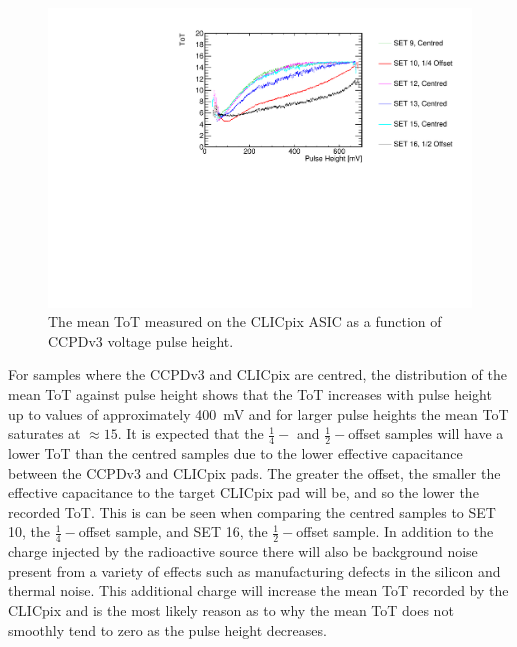\begin{figure}[h!]
\centering
\includegraphics[width=1.0\textwidth]{CLICdpVertex/Plots/RadSourceAnalysis/AllSETs_TargetTot_PulseHeight.pdf}
\caption[The mean ToT measured on the CLICpix ASIC as a function of CCPDv3 voltage pulse height.]{The mean ToT measured on the CLICpix ASIC as a function of CCPDv3 voltage pulse height.}
\label{fig:tot}
\end{figure}

For samples where the CCPDv3 and CLICpix are centred, the distribution of the mean ToT against pulse height shows that the ToT increases with pulse height up to values of approximately 400~mV and for larger pulse heights the mean ToT saturates at $\approx 15$.  It is expected that the $\frac{1}{4}-$ and $\frac{1}{2}-$offset samples will have a lower ToT than the centred samples due to the lower effective capacitance between the CCPDv3 and CLICpix pads.  The greater the offset, the smaller the effective capacitance to the target CLICpix pad will be, and so the lower the recorded ToT.  This is can be seen when comparing the centred samples to SET 10, the $\frac{1}{4}-$offset sample, and SET 16, the $\frac{1}{2}-$offset sample.  In addition to the charge injected by the radioactive source there will also be background noise present from a variety of effects such as manufacturing defects in the silicon and thermal noise.  This additional charge will increase the mean ToT recorded by the CLICpix and is the most likely reason as to why the mean ToT does not smoothly tend to zero as the pulse height decreases.


